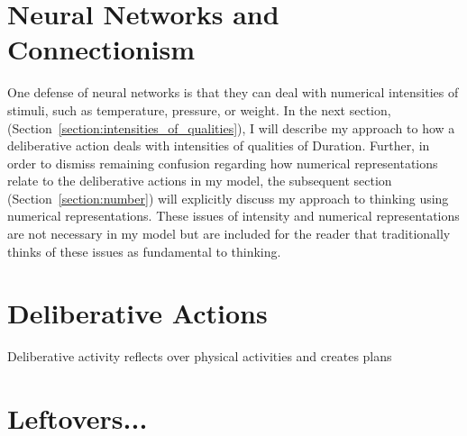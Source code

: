 \section{Neural Networks and Connectionism}

One defense of neural networks is that they can deal with numerical
intensities of stimuli, such as temperature, pressure, or weight.  In
the next section, (Section~\ref{section:intensities_of_qualities}), I
will describe my approach to how a deliberative action deals with
intensities of qualities of Duration.  Further, in order to dismiss
remaining confusion regarding how numerical representations relate to
the deliberative actions in my model, the subsequent section
(Section~\ref{section:number}) will explicitly discuss my approach to
thinking using numerical representations.  These issues of intensity
and numerical representations are not necessary in my model but are
included for the reader that traditionally thinks of these issues as
fundamental to thinking.



\section{Deliberative Actions}

Deliberative activity reflects over physical activities and creates plans 


\section{Leftovers...}



